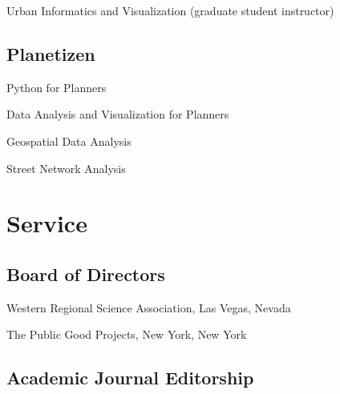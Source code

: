 \documentclass[11pt,letterpaper]{report} %
\newcommand{\listitemspace}{0.25em}
\renewenvironment{itemize}
{
  \begin{list}{}{\setlength{\leftmargin}{0em}
      \setlength{\parskip}{0em}
      \setlength{\itemsep}{\listitemspace}
  \setlength{\parsep}{\listitemspace}}}
  {
\end{list}}
\begin{document}
\begin{itemize}

  \item Urban Informatics and Visualization (graduate student instructor)

\end{itemize}

\subsection*{Planetizen}

\begin{itemize}

  \item Python for Planners
  \item Data Analysis and Visualization for Planners
  \item Geospatial Data Analysis
  \item Street Network Analysis

\end{itemize}

\section*{Service}

\subsection*{Board of Directors}

\begin{tablist}

\item[2026--]    \tab{}Western Regional Science Association, Las Vegas, Nevada
\item[2024--]    \tab{}The Public Good Projects, New York, New York

\end{tablist}

\subsection*{Academic Journal Editorship}
\end{document}
